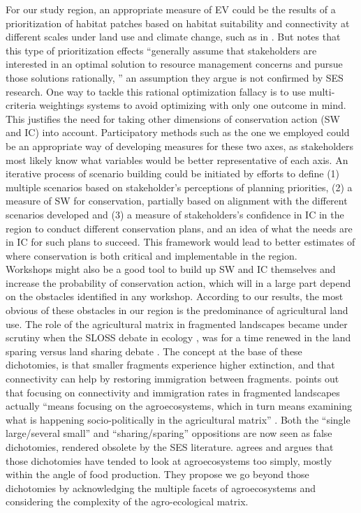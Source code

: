 \documentclass[12pt,Bold,TexShade]{thesis/mcgilletdclass}
\begin{document}
{For our study region, an appropriate measure of EV could be the results of a prioritization of habitat patches based on habitat suitability and connectivity at different scales under land use and climate change, such as in \cite{albert_applying_2017}. But \citeauthor{williamson_spatially_2018} notes that this type of prioritization effects “generally assume that stakeholders are interested in an optimal solution to resource management concerns and pursue those solutions rationally, ” an assumption they argue is not confirmed by SES research. One way to tackle this rational optimization fallacy is to use multi-criteria weightings systems to avoid optimizing with only one outcome in mind. This justifies the need for taking other dimensions of conservation action (SW and IC) into account. Participatory methods such as the one we employed could be an appropriate way of developing measures for these two axes, as stakeholders most likely know what variables would be better representative of each axis. An iterative process of scenario building could be initiated by efforts to define (1) multiple scenarios based on stakeholder’s perceptions of planning priorities, (2) a measure of SW for conservation, partially based on alignment with the different scenarios developed and (3) a measure of stakeholders’s confidence in IC in the region to conduct different conservation plans, and an idea of what the needs are in IC for such plans to succeed. This framework would lead to better estimates of where conservation is both critical and implementable in the region. \\

Workshops might also be a good tool to build up SW and IC themselves and increase the probability of conservation action, which will in a large part depend on the obstacles identified in any workshop. According to our results, the most obvious of these obstacles in our region is the predominance of agricultural land use. The role of the agricultural matrix in fragmented landscapes became under scrutiny when the SLOSS debate in ecology \citep{diamond_island_1975, simberloff_island_1976}, was for a time renewed in the land sparing versus land sharing debate \citep{fischer_land_2014}. The concept at the base of these dichotomies, is that smaller fragments experience higher extinction, and that connectivity can help by restoring immigration between fragments. \cite{perfecto_natures_2019} points out that focusing on connectivity and immigration rates in fragmented landscapes actually “means focusing on the agroecosystems, which in turn means examining what is happening socio-politically in the agricultural matrix” \citep{perfecto_natures_2019}. Both the “single large/several small” and “sharing/sparing” oppositions are now seen as false dichotomies, rendered obsolete by the SES literature. \cite{bennett_changing_2017} agrees and argues that those dichotomies have tended to look at agroecosystems too simply, mostly within the angle of food production. They propose we go beyond those dichotomies by acknowledging the multiple facets of agroecosystems and considering the complexity of the agro-ecological matrix. \\

}
\end{document}
